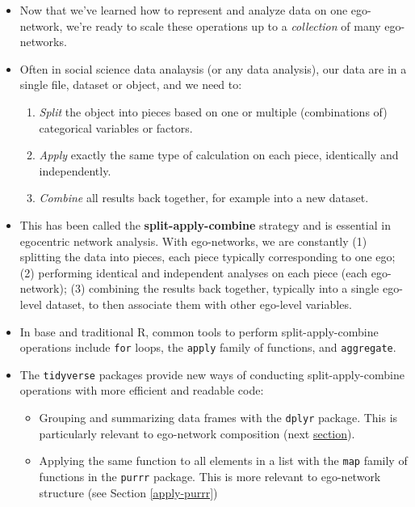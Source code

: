 \documentclass[
]{book}
\providecommand{\tightlist}{%
  \setlength{\itemsep}{0pt}\setlength{\parskip}{0pt}}
\begin{document}
\begin{itemize}
\tightlist
\item
  Now that we've learned how to represent and analyze data on one ego-network, we're ready to scale these operations up to a \emph{collection} of many ego-networks.
\item
  Often in social science data analaysis (or any data analysis), our data are in a single file, dataset or object, and we need to:

  \begin{enumerate}
  \def\labelenumi{\arabic{enumi}.}
  \tightlist
  \item
    \emph{Split} the object into pieces based on one or multiple (combinations of) categorical variables or factors.
  \item
    \emph{Apply} exactly the same type of calculation on each piece, identically and independently.
  \item
    \emph{Combine} all results back together, for example into a new dataset.
  \end{enumerate}
\item
  This has been called the \textbf{split-apply-combine} strategy \citep{wickham_split-apply-combine_2011} and is essential in egocentric network analysis. With ego-networks, we are constantly (1) splitting the data into pieces, each piece typically corresponding to one ego; (2) performing identical and independent analyses on each piece (each ego-network); (3) combining the results back together, typically into a single ego-level dataset, to then associate them with other ego-level variables.
\item
  In base and traditional R, common tools to perform split-apply-combine operations include \texttt{for} loops, the \texttt{apply} family of functions, and \texttt{aggregate}.
\item
  The \texttt{tidyverse} packages provide new ways of conducting split-apply-combine operations with more efficient and readable code:

  \begin{itemize}
  \tightlist
  \item
    Grouping and summarizing data frames with the \texttt{dplyr} package. This is particularly relevant to ego-network composition (next \protect\hyperlink{summarize-dplyr}{section}).
  \item
    Applying the same function to all elements in a list with the \texttt{map} family of functions in the \texttt{purrr} package. This is more relevant to ego-network structure (see Section \ref{apply-purrr})
  \end{itemize}
\end{itemize}
\end{document}
